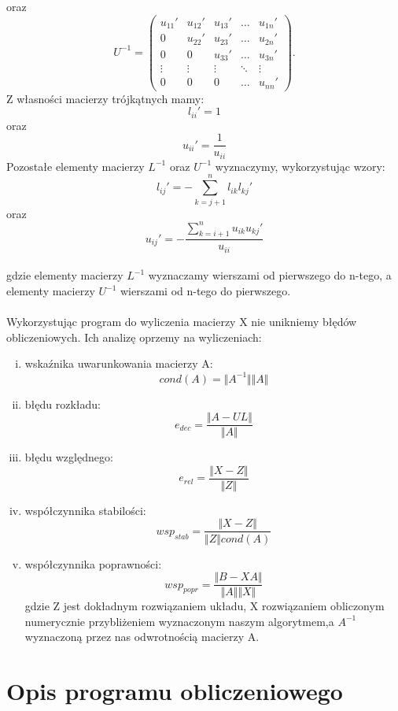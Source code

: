 \documentclass[12pt]{article}
\begin{document}
oraz
\[
U^{-1}=\begin{pmatrix}
u_{11}' & u_{12}' & u_{13}' & \ldots & u_{1n}' \\
0 & u_{22}' & u_{23}' & \ldots & u_{2n}' \\
0 & 0 & u_{33}' & \ldots & u_{3n}' \\
\vdots & \vdots & \vdots & \ddots & \vdots \\
0 & 0 & 0 & \ldots & u_{nn}'
\end{pmatrix}.
\]
Z w\l{}asno\'sci macierzy tr\'ojk\k{a}tnych mamy:
\[
l_{ii}'=1
\]
oraz
\[
u_{ii}'=\frac{1}{u_{ii}}
\]
Pozosta\l{}e elementy macierzy $L^{-1}$ oraz $U^{-1}$ wyznaczymy, wykorzystuj\k{a}c wzory:
\[
l_{ij}'=-\sum_{k=j+1}^n l_{ik}l_{kj}'
\]
oraz
\[
u_{ij}'=-\frac{\sum_{k=i+1}^n u_{ik}u_{kj}'}{u_{ii}}
\]
\\
gdzie elementy macierzy $L^{-1}$ wyznaczamy wierszami od pierwszego do n-tego, a elementy macierzy $U^{-1}$ wierszami od n-tego do pierwszego. 
\\
\\
Wykorzystuj\k{a}c program do wyliczenia macierzy X nie unikniemy b\l{}\k{e}d\'ow obliczeniowych. Ich analiz\k{e} oprzemy na wyliczeniach:
\begin{enumerate}[i)]
\item wska\'znika uwarunkowania macierzy A:
\[
cond(A)=\Vert A^{-1}\Vert  \Vert A \Vert
\]
\item b\l{}\k{e}du rozk\l{}adu:
\[
e_{dec}=\frac{\Vert A-UL \Vert}{\Vert A \Vert}
\]
\item b\l{}\k{e}du wzgl\k{e}dnego:
\[
e_{rel}=\frac{\Vert X-Z \Vert}{\Vert Z \Vert}
\]
\item wsp\'o\l{}czynnika stabilo\'sci:
\[
wsp_{stab}=\frac{\Vert X-Z \Vert}{\Vert Z \Vert cond(A)}
\]
\item wsp\'o\l{}czynnika poprawno\'sci:
\[
wsp_{popr}=\frac{\Vert B-XA \Vert}{\Vert A \Vert \Vert X \Vert}
\]
gdzie Z jest dok\l{}adnym rozwi\k{a}zaniem uk\l{}adu, X rozwi\k{a}zaniem obliczonym numerycznie przybli\.zeniem wyznaczonym naszym algorytmem,a $A^{-1}$ wyznaczon\k{a} przez nas odwrotno\'sci\k{a} macierzy A. 


\end{enumerate}

\vskip20pt

\section{Opis programu obliczeniowego}
\end{document}
